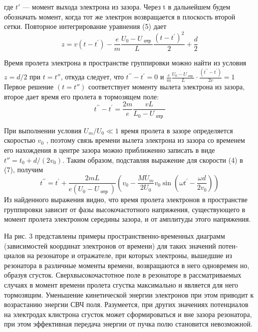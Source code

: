 где $t'$ — момент выхода электрона из зазора. Через t в дальнейшем будем
обозначать момент, когда тот же электрон возвращается в плоскость второй
сетки. Повторное интегрирование уравнения (5) дает
\begin{equation}
	z = v \left( t - t ^ { \prime } \right) - \frac { e } { m } \frac { U _ { 0 } - U _ { \text { отр } } } { L } \frac { \left( t - t ^ { \prime } \right) ^ { 2 } } { 2 } + \frac { d } { 2 }
\end{equation}

Время пролета электрона в пространстве группировки можно найти из
условия $z = d / 2$ при $t=t''$, откуда следует, что 
$t ^ { \prime \prime } - t ^ { \prime } = 0$ и 
$\frac { e } { m } \frac { U _ { 0 } - U _ { \text { отр } } } { L }\cdot \frac { \left( t ^ { \prime \prime } - t ^ { \prime } \right) } { 2 v } = 1$
Первое решение $(t = t'' )$ соответствует моменту вылета элек­трона из зазора, второе дает время его пролета в тормозящем поле:
\begin{equation}
	t ^ { \prime \prime } - t ^ { \prime } = \frac { 2 m } { e } \frac { v L } { L _ { 0 } - U _ { \text { отр } } }
\end{equation}

При выполнении условия $U_{ m } / U _{ 0 } \ll 1$ время пролета в зазоре определяется
скоростью $v_0$ , поэтому связь времени вылета электрона из зазора со време­нем его нахождения в центре зазора можно приближенно записать в виде
$t'' = t _ { 0 } + d / \left( 2 v _ { 0 } \right)$. Таким образом, подставляя выражение для скорости (4) в
(7), получим
\begin{equation}
	t ^ { \prime \prime } = t ^ { \prime } + \frac { 2 m L } { e \left( U _ { 0 } - U _ { \text { отр } } \right) } \left( v _ { 0 } - \frac { M U _ { m } } { 2 U _ { 0 } } v _ { 0 } \sin \left( \omega t ^ { \prime } - \frac { \omega d } { 2 v _ { 0 } } \right) \right)
\end{equation}
Из найденного выражения видно, что время пролета электронов в про­странстве группировки зависит от фазы высокочастотного напряжения, су­ществующего в момент пролета электроном середины зазора, и от амплиту­ды этого напряжения.

На рис. 3 представлены примеры пространственно-временных диаграмм
(зависимостей координат электронов от времени) для таких значений потен­
циалов на резонаторе и отражателе, при которых электроны, вышедшие из
резонатора в различные моменты времени, возвращаются в него одновремен­
но, образуя сгусток. Сверхвысокочастотное поле в резонаторе в рассматри­ваемых случаях в момент времени пролета сгустка максимально и является
для него тормозящим. Уменьшение кинетической энергии электронов при
этом приводит к возрастанию энергии СВЧ поля. Разумеется, при других
значениях потенциалов на электродах клистрона сгусток может сформиро­ваться и вне зазора резонатора, при этом эффективная передача энергии от
пучка полю становится невозможной.

